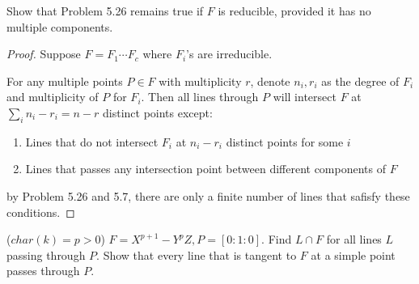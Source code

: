 \documentclass{solution}
\begin{document}
\begin{problem}{5.27}
    Show that Problem 5.26 remains true if $F$ is reducible, provided it has no multiple components.
\end{problem}

\begin{proof}
    Suppose $F = F_1 \cdots F_c$ where $F_i$'s are irreducible.
    
    For any multiple points $P \in F$ with multiplicity $r$, denote $n_i, r_i$ as the degree of $F_i$ and multiplicity of $P$ for $F_i$. Then all lines through $P$ will intersect $F$ at $\sum\limits_{i} n_i - r_i = n - r$ distinct points except:
    \begin{enumerate}
        \item Lines that do not intersect $F_i$ at $n_i - r_i$ distinct points for some $i$
        \item Lines that passes any intersection point between different components of $F$
    \end{enumerate}
    by Problem 5.26 and 5.7, there are only a finite number of lines that safisfy these conditions.
\end{proof}

\begin{problem}{5.28}
    ($char(k) = p \gt 0$) $F = X^{p + 1} - Y^pZ, P = [0:1:0]$. Find $L \cap F$ for all lines $L$ passing through $P$. Show that every line that is tangent to $F$ at a simple point passes through $P$.
\end{problem}
\end{document}
